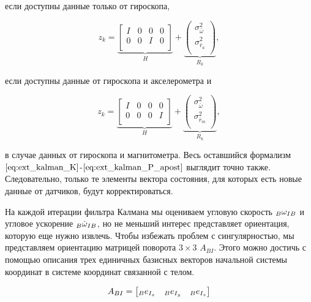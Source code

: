 \documentclass[12pt,a4paper]{article}
\newcounter{subsubsubsection}[subsubsection]
\begin{document}
если доступны данные только от гироскопа, 

\begin{equation*}
	z_k = \underbrace{
		\begin{bmatrix}
			I & 0 & 0 & 0 \\
			0 & 0 & I & 0 \\
		\end{bmatrix}
	}_H + \underbrace{
		\begin{pmatrix}
			\sigma_{\bar\omega}^2 \\
			\sigma_{\bar r_a}^2 \\
		\end{pmatrix}
	}_{R_k},
\end{equation*}	

если доступны данные от гироскопа и акселерометра и

\begin{equation*}
	z_k = \underbrace{
		\begin{bmatrix}
			I & 0 & 0 & 0 \\
			0 & 0 & 0 & I \\
		\end{bmatrix}
	}_H + \underbrace{
		\begin{pmatrix}
			\sigma_{\bar\omega}^2 \\
			\sigma_{\bar r_m}^2 \\
		\end{pmatrix}
	}_{R_k},
\end{equation*}	

в случае данных от гироскопа и магнитометра. Весь оставшийся формализм $\eqref{eq:ext_kalman_K}$-$\eqref{eq:ext_kalman_P_apost}$ выглядит точно также. Следовательно, только те элементы вектора состояния, для которых есть новые данные от датчиков, будут корректироваться.


На каждой итерации фильтра Калмана мы оцениваем угловую скорость ${\vphantom \omega}_B \omega_{IB}$ и угловое ускорение ${\vphantom \omega}_B \dot\omega_{IB}$, но не меньший интерес представляет ориентация, которую еще нужно извлечь. Чтобы избежать проблем с сингулярностью, мы представляем ориентацию матрицей поворота $3 \times 3$ $A_{BI}$. Этого можно достичь с помощью описания трех единичных базисных векторов начальной системы координат в системе координат связанной с телом. 

$$ A_{BI} = 
	\begin{bmatrix} 
		{\vphantom e}_B e_{I_x} & {\vphantom e}_B e_{I_y} & {\vphantom e}_B e_{I_z} \\
	\end{bmatrix}
$$
\end{document}
